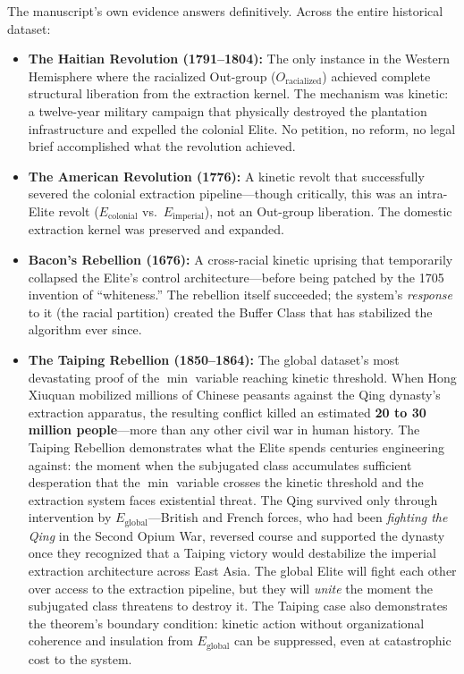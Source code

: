 \documentclass[12pt,openany]{book}
\begin{document}
The manuscript's own evidence answers definitively. Across the entire historical dataset:

\begin{itemize}
    \item \textbf{The Haitian Revolution (1791--1804):} The only instance in the Western Hemisphere where the racialized Out-group ($O_{\text{racialized}}$) achieved complete structural liberation from the extraction kernel. The mechanism was kinetic: a twelve-year military campaign that physically destroyed the plantation infrastructure and expelled the colonial Elite. No petition, no reform, no legal brief accomplished what the revolution achieved.

    \item \textbf{The American Revolution (1776):} A kinetic revolt that successfully severed the colonial extraction pipeline---though critically, this was an intra-Elite revolt ($E_{\text{colonial}}$ vs.\ $E_{\text{imperial}}$), not an Out-group liberation. The domestic extraction kernel was preserved and expanded.

    \item \textbf{Bacon's Rebellion (1676):} A cross-racial kinetic uprising that temporarily collapsed the Elite's control architecture---before being patched by the 1705 invention of ``whiteness.'' The rebellion itself succeeded; the system's \textit{response} to it (the racial partition) created the Buffer Class that has stabilized the algorithm ever since.

    \item \textbf{The Taiping Rebellion (1850--1864):} The global dataset's most devastating proof of the $\min$ variable reaching kinetic threshold. When Hong Xiuquan mobilized millions of Chinese peasants against the Qing dynasty's extraction apparatus, the resulting conflict killed an estimated \textbf{20 to 30 million people}---more than any other civil war in human history. The Taiping Rebellion demonstrates what the Elite spends centuries engineering against: the moment when the subjugated class accumulates sufficient desperation that the $\min$ variable crosses the kinetic threshold and the extraction system faces existential threat. The Qing survived only through intervention by $E_{\text{global}}$---British and French forces, who had been \textit{fighting the Qing} in the Second Opium War, reversed course and supported the dynasty once they recognized that a Taiping victory would destabilize the imperial extraction architecture across East Asia. The global Elite will fight each other over access to the extraction pipeline, but they will \textit{unite} the moment the subjugated class threatens to destroy it. The Taiping case also demonstrates the theorem's boundary condition: kinetic action without organizational coherence and insulation from $E_{\text{global}}$ can be suppressed, even at catastrophic cost to the system.
\end{itemize}
\end{document}

